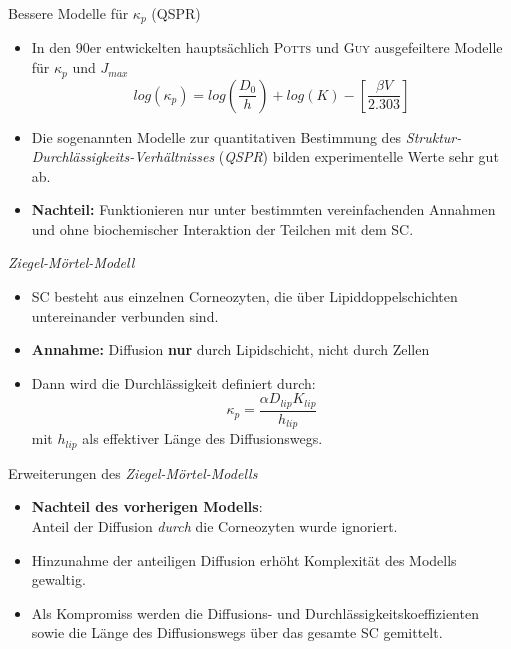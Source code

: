 \documentclass[utf8x,compress,professionalfonts]{beamer}
\begin{document}
\begin{frame}{Bessere Modelle f\"ur $\kappa_p$ (QSPR)}
  \begin{itemize}
    \item<1-> In den 90er entwickelten haupts\"achlich \textsc{Potts} und \textsc{Guy}
      ausgefeiltere Modelle f\"ur $\kappa_p$ und $J_{max}$
      $$log(\kappa_p)=log\left(\frac{D_0}{h}\right)+log(K)-\left[\frac{\beta V}{2.303}\right]$$
    \item<2-> Die sogenannten Modelle zur quantitativen Bestimmung des
      \textit{Struktur-Durchl\"assigkeits-Verh\"altnisses} (\textit{QSPR}) bilden
      experimentelle Werte sehr gut ab.
      \bigskip
    \item<3-> \textbf{Nachteil:} Funktionieren nur unter bestimmten vereinfachenden
      Annahmen und ohne biochemischer Interaktion der Teilchen mit dem SC.
  \end{itemize}
\end{frame}


\begin{frame}{\textit{Ziegel-M\"ortel-Modell}}
  \begin{itemize}
    \item<1-> SC besteht aus einzelnen Corneozyten, die \"uber Lipiddoppelschichten
      untereinander verbunden sind.
      \bigskip
    \item<2-> \textbf{Annahme:} Diffusion \textbf{nur} durch Lipidschicht, nicht
      durch Zellen
      \bigskip
    \item<2-> Dann wird die Durchl\"assigkeit definiert durch:
      \begin{equation}
        \kappa_p = \frac{\alpha D_{lip}K_{lip}}{h_{lip}}
      \end{equation}
      mit $h_{lip}$ als effektiver L\"ange des Diffusionswegs.
  \end{itemize}
\end{frame}

\begin{frame}{Erweiterungen des \textit{Ziegel-M\"ortel-Modells}}
  \begin{itemize}
    \item<1-> \textbf{Nachteil des vorherigen Modells}:\\
      Anteil der Diffusion \textit{durch} die Corneozyten wurde ignoriert.
      \bigskip
    \item<2-> Hinzunahme der anteiligen Diffusion erh\"oht Komplexit\"at des Modells
      gewaltig.
      \bigskip
    \item<3-> Als Kompromiss werden die Diffusions- und Durchl\"assigkeitskoeffizienten
      sowie die L\"ange des Diffusionswegs \"uber das gesamte SC gemittelt.
  \end{itemize}
\end{frame}
\end{document}
